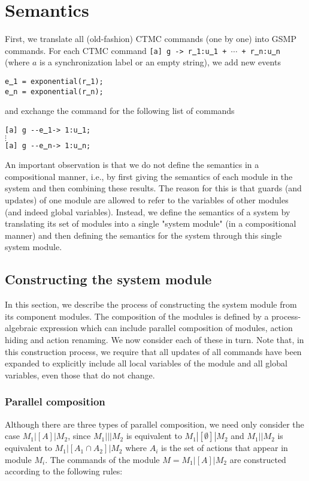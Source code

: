 \documentclass{article}
\renewcommand{\_}{\underline{~}}
\newcommand{\code}[1]{\texttt{#1}}
\begin{document}
\section*{Semantics}

First, we translate all (old-fashion) CTMC commands (one by one) into GSMP commands.
For each CTMC command \code{[a] g -> r\_1:u\_1 + $\cdots$ + r\_n:u\_n} (where $a$ is a synchronization label or an empty string), we add 
new events 
\begin{center}
	\code{e\_1 = exponential(r\_1);} \\
	\code{e\_n = exponential(r\_n);}
\end{center}
and exchange the command for the following list of commands
\begin{center}
	\code{[a] g {-}{-}e\_1-> 1:u\_1;} \\
	$\vdots$ \\
	\code{[a] g {-}{-}e\_n-> 1:u\_n;} 
\end{center}

An important observation is that we do not define the semantics in a compositional manner, i.e., by first giving the semantics of each module in the system and then combining these results. 
The reason for this is that guards (and updates) of one module are allowed to refer to the variables of other modules (and indeed global variables). 
Instead, we define the semantics of a system by translating its set of modules into a single "system module" (in a compositional manner) and then defining the semantics for the system through this single system module.


\subsection*{Constructing the system module}
In this section, we describe the process of constructing the system module from its component modules. 
The composition of the modules is defined by a process-algebraic expression which can include parallel composition of modules, action hiding and action renaming. 
We now consider each of these in turn. Note that, in this construction process, we require that all updates of all commands have been expanded to explicitly include all local variables of the module and all global variables, even those that do not change.


\subsubsection*{Parallel composition}
Although there are three types of parallel composition, we need only consider the case
$M_1|[A]|M_2$, since $M_1|||M_2$ is equivalent to $M_1|[\emptyset]|M_2$ and $M_1||M_2$ is equivalent to $M_1|[A_1 \cap A_2]|M_2$ where $A_i$ is the set of actions that appear in module $M_i$. 
The commands of the module $M = M_1|[A]|M_2$ are constructed according to the following rules:
\end{document}
